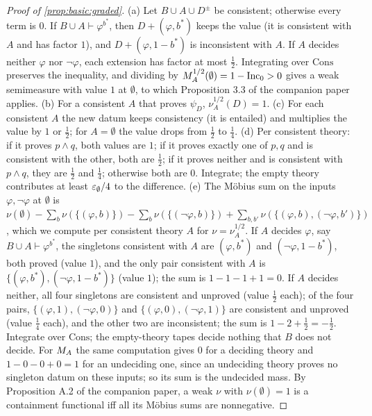 \begin{proof}[Proof of \cref{prop:basic:graded}]
(a) Let $B\cup A\cup D^\pm$ be consistent; otherwise every term is $0$. If $B\cup A\vdash\varphi^{b^*}$, then $D+(\varphi,b^*)$ keeps the value (it is consistent with $A$ and has factor $1$), and $D+(\varphi,1-b^*)$ is inconsistent with $A$. If $A$ decides neither $\varphi$ nor $\neg\varphi$, each extension has factor at most $\frac12$. Integrating over $\mathrm{Cons}$ preserves the inequality, and dividing by $M_{A}^{1/2}(\emptyset)=1-\mathrm{Inc}_0>0$ gives a weak semimeasure with value $1$ at $\emptyset$, to which Proposition 3.3 of the companion paper applies.
(b) For a consistent $A$ that proves $\psi_D$, $\nu^{1/2}_A(D)=1$.
(c) For each consistent $A$ the new datum keeps consistency (it is entailed) and multiplies the value by $1$ or $\frac12$; for $A=\emptyset$ the value drops from $\frac12$ to $\frac14$.
(d) Per consistent theory: if it proves $p\wedge q$, both values are $1$; if it proves exactly one of $p,q$ and is consistent with the other, both are $\frac12$; if it proves neither and is consistent with $p\wedge q$, they are $\frac12$ and $\frac14$; otherwise both are $0$. Integrate; the empty theory contributes at least $\varepsilon_{\emptyset}/4$ to the difference.
(e) The Möbius sum on the inputs $\varphi,\neg\varphi$ at $\emptyset$ is $\nu(\emptyset)-\sum_b\nu(\{(\varphi,b)\})-\sum_b\nu(\{(\neg\varphi,b)\})+\sum_{b,b'}\nu(\{(\varphi,b),(\neg\varphi,b')\})$, which we compute per consistent theory $A$ for $\nu=\nu^{1/2}_A$. If $A$ decides $\varphi$, say $B\cup A\vdash\varphi^{b^*}$, the singletons consistent with $A$ are $(\varphi,b^*)$ and $(\neg\varphi,1-b^*)$, both proved (value $1$), and the only pair consistent with $A$ is $\{(\varphi,b^*),(\neg\varphi,1-b^*)\}$ (value $1$); the sum is $1-1-1+1=0$. If $A$ decides neither, all four singletons are consistent and unproved (value $\frac12$ each); of the four pairs, $\{(\varphi,1),(\neg\varphi,0)\}$ and $\{(\varphi,0),(\neg\varphi,1)\}$ are consistent and unproved (value $\frac14$ each), and the other two are inconsistent; the sum is $1-2+\frac12=-\frac12$. Integrate over $\mathrm{Cons}$; the empty-theory tapes decide nothing that $B$ does not decide. For $M_{A}$ the same computation gives $0$ for a deciding theory and $1-0-0+0=1$ for an undeciding one, since an undeciding theory proves no singleton datum on these inputs; so its sum is the undecided mass. By Proposition A.2 of the companion paper, a weak $\nu$ with $\nu(\emptyset)=1$ is a containment functional iff all its Möbius sums are nonnegative.
\end{proof}

